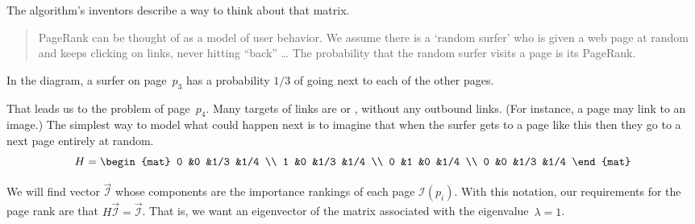 The algorithm's inventors describe a way to think about that matrix. 
\begin{quotation}
PageRank can be thought of as a model of user behavior. 
We assume there is a `random surfer' who is
given a web page at random and keeps clicking on links, 
never hitting ``back'' \ldots 
The probability that the random surfer visits a page is its PageRank.
\cite{BrinPage}
\end{quotation}
In the diagram, a surfer on page~$p_3$ has a probability $1/3$ of going 
next to each of the other pages. 

That leads us to the problem of page~$p_4$.
Many targets of links are 
 or ,
without any outbound links.
(For instance, a page may link to an image.)
The simplest way to model what could happen next is to 
imagine that when the surfer gets to a page like this
then they go to a next page entirely at random.
\begin{equation*}
  H=\begin{mat}
    0   &0  &1/3  &1/4   \\
    1   &0  &1/3  &1/4   \\
    0   &1  &0    &1/4 \\
    0   &0  &1/3  &1/4
  \end{mat}
\end{equation*}

We will find vector $\vec{\mathcal{I}}$ whose components are the
importance rankings of each page $\mathcal{I}(p_i)$.
With this notation, 
our requirements for the page rank are that 
$H\vec{\mathcal{I}}=\vec{\mathcal{I}}$.
That is, we want an eigenvector of the matrix associated with the
eigenvalue~$\lambda=1$.

